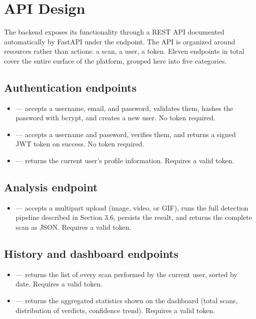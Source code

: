\section{API Design}

The backend exposes its functionality through a REST API documented automatically by FastAPI under the  endpoint. The API is organized around resources rather than actions: a scan, a user, a token. Eleven endpoints in total cover the entire surface of the platform, grouped here into five categories.

\subsection*{Authentication endpoints}
\begin{itemize}
\item {} --- accepts a username, email, and password, validates them, hashes the password with bcrypt, and creates a new user. No token required.
\item {} --- accepts a username and password, verifies them, and returns a signed JWT token on success. No token required.
\item {} --- returns the current user's profile information. Requires a valid token.
\end{itemize}

\subsection*{Analysis endpoint}
\begin{itemize}
\item {} --- accepts a multipart upload (image, video, or GIF), runs the full detection pipeline described in Section 3.6, persists the result, and returns the complete scan as JSON. Requires a valid token.
\end{itemize}

\subsection*{History and dashboard endpoints}
\begin{itemize}
\item {} --- returns the list of every scan performed by the current user, sorted by date. Requires a valid token.
\item {} --- returns the aggregated statistics shown on the dashboard (total scans, distribution of verdicts, confidence trend). Requires a valid token.
\end{itemize}

